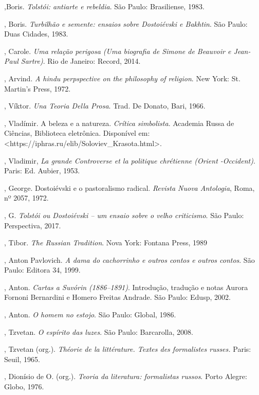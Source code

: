 \begin{Parskip}
,Boris. \emph{Tolstói: antiarte e rebeldia}. São Paulo: Brasiliense, 1983.

, Boris. \emph{Turbilhão e semente: ensaios sobre Dostoiévski e Bakhtin}. São Paulo: Duas Cidades, 1983.

, Carole. \emph{Uma relação perigosa (Uma biografia
de Simone de Beauvoir e Jean-Paul Sartre)}. Rio de Janeiro: Record, 2014.

, Arvind. \emph{A hindu perpspective on the philosophy of
religion}. New York: St. Martin's Press, 1972.

, Víktor. \emph{Una Teoria Della Prosa}. Trad. De Donato,
Bari, 1966.

, Vladímir. A beleza e a natureza. \emph{Crítica simbolista}. Academia Russa de Ciências,
  Biblioteca eletrônica. Disponível em: \textless{}https://iphras.ru/elib/Soloviev\_Krasota.html\textgreater{}.

, Vladimir, \emph{La grande Controverse et la politique
chrétienne (Orient -Occident)}. Paris: Ed. Aubier, 1953.

, George. Dostoiévski e o pastoralismo radical. \emph{Revista Nuova Antologia}, Roma, nº 2057, 1972.

, G. \emph{Tolstói ou Dostoiévski -- um ensaio sobre o velho criticismo}. São Paulo: Perspectiva, 2017.

, Tibor. \emph{The Russian Tradition}. Nova York: Fontana Press, 1989

, Anton Pavlovich. \emph{A dama do cachorrinho e outros contos e
outros contos}. São Paulo: Editora 34, 1999.

, Anton. \emph{Cartas a Suvórin (1886--1891)}. Introdução, tradução
e notas Aurora Fornoni Bernardini e Homero Freitas Andrade. São Paulo: Edusp, 2002.

, Anton. \emph{O homem no estojo}. São Paulo: Global, 1986.

, Tzvetan. \emph{O espírito das luzes}. São Paulo: Barcarolla, 2008.

, Tzvetan (org.). \emph{Théorie de la littérature. Textes des 
formalistes russes.} Paris: Seuil, 1965.

, Dionísio de O. (org.). \emph{Teoria da literatura: formalistas russos}. Porto Alegre: Globo, 1976.


\end{Parskip}
